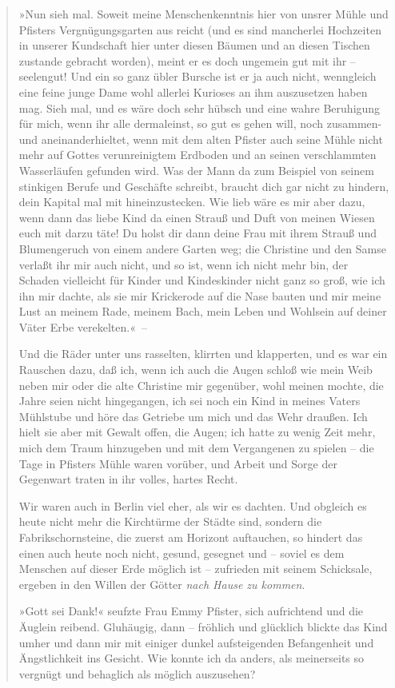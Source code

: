 \begin{verse}
»Nun sieh mal. Soweit meine Menschenkenntnis hier von unsrer Mühle
und Pfisters Vergnügungsgarten aus reicht (und es sind mancherlei
Hochzeiten in unserer Kundschaft hier unter diesen Bäumen und an
diesen Tischen zustande gebracht worden), meint er es doch ungemein
gut mit ihr – seelengut! Und ein so ganz übler Bursche ist er ja
auch nicht, wenngleich eine feine junge Dame wohl allerlei Kurioses
an ihm auszusetzen haben mag. Sieh mal, und es wäre doch sehr
hübsch und eine wahre Beruhigung für mich, wenn ihr alle
dermaleinst, so gut es gehen will, noch zusammen- und
aneinanderhieltet, wenn mit dem alten Pfister auch seine Mühle
nicht mehr auf Gottes verunreinigtem Erdboden und an seinen
verschlammten Wasserläufen gefunden wird. Was der Mann da zum
Beispiel von seinem stinkigen Berufe und Geschäfte schreibt,
braucht dich gar nicht zu hindern, dein Kapital mal mit
hineinzustecken. Wie lieb wäre es mir aber dazu, wenn dann das
liebe Kind da einen Strauß und Duft von meinen Wiesen euch mit
darzu täte! Du holst dir dann deine Frau mit ihrem Strauß und
Blumengeruch von einem andere Garten weg; die Christine und den
Samse verlaßt ihr mir auch nicht, und so ist, wenn ich nicht mehr
bin, der Schaden vielleicht für Kinder und Kindeskinder nicht ganz
so groß, wie ich ihn mir dachte, als sie mir Krickerode auf die
Nase bauten und mir meine Lust an meinem Rade, meinem Bach, mein
Leben und Wohlsein auf deiner Väter Erbe verekelten.«~–

Und die Räder unter uns rasselten, klirrten und klapperten, und es
war ein Rauschen dazu, daß ich, wenn ich auch die Augen schloß wie
mein Weib neben mir oder die alte Christine mir gegenüber, wohl
meinen mochte, die Jahre seien nicht hingegangen, ich sei noch ein
Kind in meines Vaters Mühlstube und höre das Getriebe um mich und
das Wehr draußen. Ich hielt sie aber mit Gewalt offen, die Augen;
ich hatte zu wenig Zeit mehr, mich dem Traum hinzugeben und mit dem
Vergangenen zu spielen – die Tage in Pfisters Mühle waren vorüber,
und Arbeit und Sorge der Gegenwart traten in ihr volles, hartes
Recht.

Wir waren auch in Berlin viel eher, als wir es dachten. Und
obgleich es heute nicht mehr die Kirchtürme der Städte sind,
sondern die Fabrikschornsteine, die zuerst am Horizont auftauchen,
so hindert das einen auch heute noch nicht, gesund, gesegnet und –
soviel es dem Menschen auf dieser Erde möglich ist – zufrieden mit
seinem Schicksale, ergeben in den Willen der Götter
\emph{nach Hause zu kommen}.

»Gott sei Dank!« seufzte Frau Emmy Pfister, sich aufrichtend und
die Äuglein reibend. Gluhäugig, dann – fröhlich und glücklich
blickte das Kind umher und dann mir mit einiger dunkel
aufsteigenden Befangenheit und Ängstlichkeit ins Gesicht. Wie
konnte ich da anders, als meinerseits so vergnügt und behaglich als
möglich auszusehen?


\end{verse}
